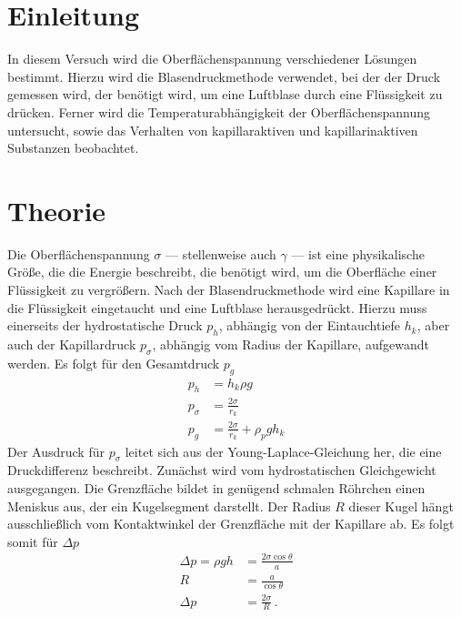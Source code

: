 \section{Einleitung}

In diesem Versuch wird die Oberflächenspannung verschiedener Lösungen bestimmt.
Hierzu wird die Blasendruckmethode verwendet, bei der der Druck gemessen wird, der benötigt wird, um eine Luftblase durch eine Flüssigkeit zu drücken.
Ferner wird die Temperaturabhängigkeit der Oberflächenspannung untersucht, sowie das Verhalten von kapillaraktiven und kapillarinaktiven Substanzen beobachtet.

\section{Theorie}

Die Oberflächenspannung $\sigma$ --- stellenweise auch $\gamma$ --- ist eine physikalische Größe, die die Energie beschreibt, die benötigt wird, um die Oberfläche einer Flüssigkeit zu vergrößern.
Nach der Blasendruckmethode wird eine Kapillare in die Flüssigkeit eingetaucht und eine Luftblase herausgedrückt.
Hierzu muss einerseits der hydrostatische Druck $p_h$, abhängig von der Eintauchtiefe $h_k$, aber auch der Kapillardruck $p_{\sigma}$, abhängig vom Radius der Kapillare, aufgewandt werden.
Es folgt für den Gesamtdruck $p_g$
\begin{align}
    p_h        &= h_k \rho g \nonumber \\
    p_{\sigma} &= \frac{2\sigma}{r_k} \nonumber \\
    p_g        &= \frac{2\sigma}{r_k} + \rho_p g h_k
\end{align}
Der Ausdruck für $p_{\sigma}$ leitet sich aus der Young-Laplace-Gleichung her, die eine Druckdifferenz beschreibt.
Zunächst wird vom hydrostatischen Gleichgewicht ausgegangen.
Die Grenzfläche bildet in genügend schmalen Röhrchen einen Meniskus aus, der ein Kugelsegment darstellt.
Der Radius $R$ dieser Kugel hängt ausschließlich vom Kontaktwinkel der Grenzfläche mit der Kapillare ab.
Es folgt somit für $\Delta p$
\begin{align*}
    \Delta p = \rho gh &= \frac{2\sigma\cos\theta}{a} \\
                     R &= \frac{a}{\cos\theta} \\
              \Delta p &= \frac{2\sigma}{R}\, \text{.}
\end{align*}

\newpage

